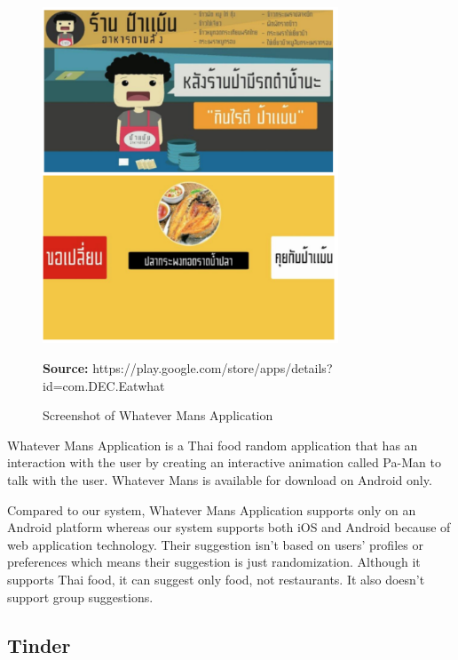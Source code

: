 \documentclass[12pt,oneside,openright,a4paper]{cpe-english-project}
\newcommand*{\captionsource}[2]{%
  \caption[{#1}]{#1}\vspace{-8pt}
  \textbf{Source:} #2}
\begin{document}
\begin{figure}[H]\centering
\includegraphics[width=250pt]{./images/2whatman.png}
\label{fig:2whatman}
\captionsource{Screenshot of Whatever Mans Application}{https://play.google.com/store/apps/details?id=com.DEC.Eatwhat}
\end{figure}\vspace{-24pt}
\vspace{1em}

Whatever Mans Application is a Thai food random application that has an interaction with the user by creating an interactive animation called Pa-Man to talk with the user. Whatever Mans is available for download on Android only.

Compared to our system, Whatever Mans Application supports only on an Android platform whereas our system supports both iOS and Android because of web application technology. Their suggestion isn't based on users’ profiles or preferences which means their suggestion is just randomization. Although it supports Thai food, it can suggest only food, not restaurants. It also doesn’t support group suggestions.

\newpage
\subsection{Tinder}
\end{document}
